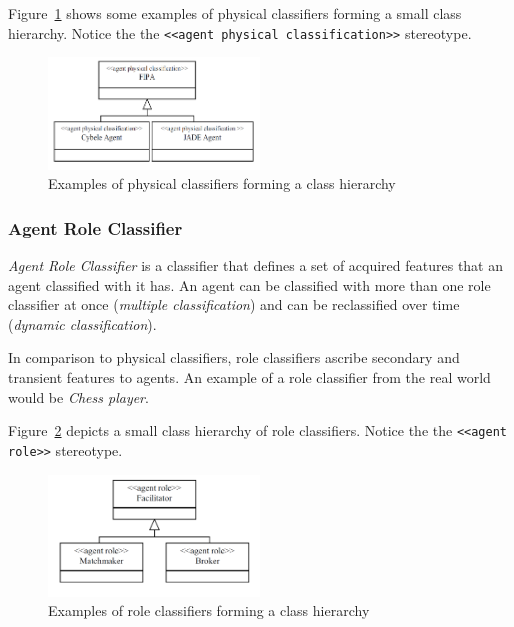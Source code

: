 Figure~\ref{figure:onp-physical-classifier-examples} shows some examples of physical classifiers forming a small class hierarchy.
Notice the the \texttt{<<agent physical classification>>} stereotype.

\begin{figure}[ht]
	\centering
	\includegraphics[width=0.5\textwidth]{images/onp/physical-classifier-examples.png}
	\caption{Examples of physical classifiers forming a class hierarchy}
	\label{figure:onp-physical-classifier-examples}
\end{figure}

\subsubsection*{Agent Role Classifier}

\textit{Agent Role Classifier} is a classifier that defines a set of acquired features that an agent classified with it has.
An agent can be classified with more than one role classifier at once (\textit{multiple classification}) and can be reclassified over time (\textit{dynamic classification}).

In comparison to physical classifiers, role classifiers ascribe secondary and transient features to agents.
An example of a role classifier from the real world would be \textit{Chess player}.

Figure~\ref{figure:onp-role-classifier-examples} depicts a small class hierarchy of role classifiers.
Notice the the \texttt{<<agent role>>} stereotype.

\begin{figure}[ht]
	\centering
	\includegraphics[width=0.5\textwidth]{images/onp/role-classifier-examples.png}
	\caption{Examples of role classifiers forming a class hierarchy}
	\label{figure:onp-role-classifier-examples}
\end{figure}

